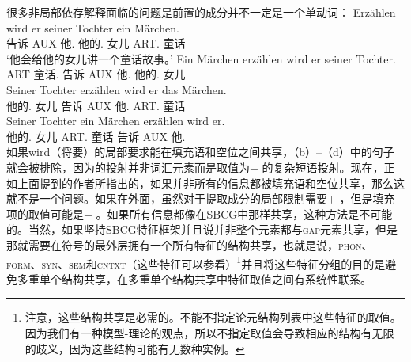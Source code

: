 很多非局部依存解释面临的问题是前置的成分并不一定是一个单动词：
\eal
\label{bsp-erzaehlen-wird}
\ex
\gll Erzählen wird er       seiner Tochter ein Märchen.\\
     告诉     AUX 他.\nom{} 他的.\dat{} 女儿   ART.\acc{}   童话\\
\glt `他会给他的女儿讲一个童话故事。'
\ex
\gll Ein Märchen        erzählen wird er       seiner Tochter.\\
     ART   童话.\acc{} 告诉      AUX 他.\nom{} 他的.\dat{}    女儿\\
\ex  
\gll Seiner Tochter        erzählen wird er       das Märchen.\\
     他的.\dat{}    女儿 告诉     AUX 他.\nom{} ART.\acc{} 童话\\
\ex  
\gll Seiner Tochter        ein Märchen        erzählen wird er.\\
     他的.\dat{}    女儿 ART.\acc{}   童话 告诉      AUX 他.\nom\\
\zl
如果wird（将要）的局部要求能在填充语和空位之间共享，（b）--（d）中的句子就会被排除，因为\vfc 的投射并非词汇元素而是取值为\lexc$-$ 的复杂短语投射。现在，正如上面提到的作者所指出的，如果并非所有的信息都被填充语和空位共享，那么这就不是一个问题。如果\lexc 在\localc 外面，虽然对于提取成分的局部限制需要\lexvc $+$ ，但是填充项的取值可能是\lexc$-$ 。如果所有信息都像在SBCG中那样共享，这种方法是不可能的。当然，如果坚持SBCG特征框架并且说并非整个\argstc 元素都与\textsc{gap}元素共享，但是那就需要在符号的最外层拥有一个所有特征的结构共享，也就是说，\textsc{phon}、\textsc{form}、\textsc{syn}、\textsc{sem}和\textsc{cntxt}（这些特征可以参看\citealp[]{Sag2012a}）\footnote{
  注意，这些结构共享是必需的。不能不指定论元结构列表中这些特征的取值。因为我们有一种模型-理论的观点，所以不指定取值会导致相应的结构有无限的歧义，因为这些结构可能有无数种实例。%
}并且将这些特征分组的目的是避免多重单个结构共享，在多重单个结构共享中特征取值之间有系统性联系。
